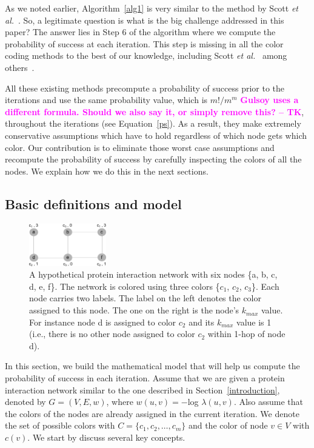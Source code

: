\documentclass{ws-procs11x85}
\newcommand{\tk}[1]{{\bf {\textcolor{magenta}{#1 -- TK}}}}
\begin{document}
As we noted earlier, Algorithm~\ref{alg1} is very similar to the
method by Scott {\it et al.}~\cite{scott}. So, a legitimate question is what
is the big challenge addressed in this paper? The answer lies in Step
6 of the algorithm where we compute the probability of success at each
iteration. This step is missing in all the color coding methods to the
best of our knowledge, including Scott {\it et al.}~\cite{scott} among
others~\cite{alon, shlomi, dost, gulsoy}. 

All these existing methods precompute a probability of success prior
to the iterations and use the same probability value, which is
$m!/m^m$  \tk{Gulsoy uses a different formula. Should we also say it, or simply
remove this?}, throughout the iterations (see Equation~\ref{ps}).
As a result, they make extremely conservative assumptions which have to
hold regardless of which node gets which color. Our contribution is to
eliminate those worst case assumptions and recompute the probability
of success by carefully inspecting the colors of all the nodes. We
explain how we do this in the next sections.



\subsection{Basic definitions and model}
\label{sec:model}

\begin{figure}
  \centering
  \includegraphics[width=0.3\textwidth]{figures/colors}
  \caption{ A hypothetical protein interaction network with six nodes
    \{a, b, c, d, e, f\}. The network is colored using three colors
    \{$c_1$, $c_2$, $c_3$\}. Each node carries two labels.  The label
    on the left denotes the color assigned to this node.  The one on
    the right is the node's $k_{max}$ value. For instance node d is
    assigned to color $c_2$ and its $k_{max}$ value is 1 (i.e., there
    is no other node assigned to color $c_2$ within 1-hop of node d). }
  \label{fig:colors}
\end{figure}


In this section, we build the mathematical model that will help us
compute the probability of success in each iteration.  Assume that we
are given a protein interaction network similar to the one described
in Section~\ref{introduction}, denoted by $G = (V, E, w)$, where $w(u,
v) = -$log $\lambda(u, v)$. Also assume that the colors of the nodes
are already assigned in the current iteration. We denote the set of
possible colors with $C = \{c_1, c_2, \ldots, c_m\}$ and the color of
node $v \in V$ with $c(v)$. We start by discuss several key concepts.
\end{document}
